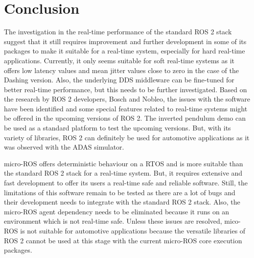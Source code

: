 \documentclass[%
xelatex,
	oneside,		%
	12pt,			%
	parskip=half,	%
	abstracton,
	chapterprefix=true%
    appendixprefix=true]
{scrbook}
\begin{document}
		\chapter{Conclusion}
			
\rofoot[\pagemark]{\pagemark}
The investigation in the real-time performance of the standard ROS 2 stack suggest that it still requires improvement and further development in some of its packages to make it suitable for a real-time system, especially for hard real-time applications. Currently, it only seems suitable for soft real-time systems as it offers low latency values and mean jitter values close to zero in the case of the Dashing version. Also, the underlying DDS middleware can be fine-tuned for better real-time performance, but this needs to be further investigated. Based on the research by ROS 2 developers, Bosch and Nobleo, the issues with the software have been identified and some special features related to real-time systems might be offered in the upcoming versions of ROS 2. The inverted pendulum demo can be used as a standard platform to test the upcoming versions. But, with its variety of libraries, ROS 2 can definitely be used for automotive applications as it was observed with the ADAS simulator.

\vspace*{0.25cm}
micro-ROS offers deterministic behaviour on a RTOS and is more suitable than the standard ROS 2 stack for a real-time system. But, it requires extensive and fast development to offer its users a real-time safe and reliable software. Still, the limitations of this software remain to be tested as there are a lot of bugs and their development needs to integrate with the standard ROS 2 stack. Also, the micro-ROS agent dependency needs to be eliminated because it runs on an environment which is not real-time safe. Unless these issues are resolved, mico-ROS is not suitable for automotive applications because the versatile libraries of ROS 2 cannot be used at this stage with the current micro-ROS core execution packages.
\end{document}
